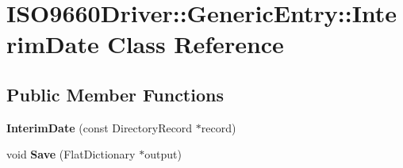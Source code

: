 \hypertarget{class_i_s_o9660_driver_1_1_generic_entry_1_1_interim_date}{}\section{I\+S\+O9660\+Driver\+:\+:Generic\+Entry\+:\+:Interim\+Date Class Reference}
\label{class_i_s_o9660_driver_1_1_generic_entry_1_1_interim_date}
\subsection*{Public Member Functions}
\begin{DoxyCompactItemize}
\item 
\mbox{\label{class_i_s_o9660_driver_1_1_generic_entry_1_1_interim_date_a18df36220dfba7f70e5f101624a6e98f}} 
{\bfseries Interim\+Date} (const Directory\+Record $\ast$record)
\item 
\mbox{\label{class_i_s_o9660_driver_1_1_generic_entry_1_1_interim_date_ab09a590fa3e149895c233a93db7564a4}} 
void {\bfseries Save} (Flat\+Dictionary $\ast$output)
\end{DoxyCompactItemize}
